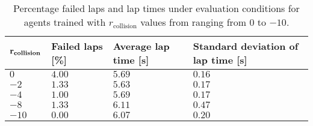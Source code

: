 \begin{table}[!htb]
\centering
\small
\begin{tabularx}{0.9\textwidth}{RLLL} 
    \hline
    $\mathbf{r}_{\text{\textbf{collision}}}$ & \textbf{Failed laps [\%]} & \textbf{Average lap time [s]} & \textbf{Standard deviation of lap time [s]}\\ 
    \hline
    $0$     & $4.00$   & $5.69$ & $0.16$ \\
    $-2$    & $1.33$   & $5.63$ & $0.17$ \\
    $-4$    & $1.00$   & $5.69$ & $0.17$ \\
    $-8$    & $1.33$   & $6.11$ & $0.47$ \\
    $-10$   & $0.00$   & $6.07$ & $0.20$ \\
    \hline
\end{tabularx}
\caption[Evaluation results of agents with different collision penalties]{Percentage failed laps and lap times under evaluation conditions for agents trained with $r_{\text{collision}}$ values from ranging from $0$ to $-10$.}
\label{tab:reward_collision}
\end{table}
